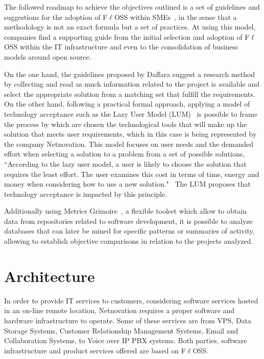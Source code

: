 \documentclass[a4paper, 12pt]{book}
\begin{document}
The followed roadmap to achieve the objectives outlined is a set of guidelines and suggestions for the adoption of F$\ell$OSS within SMEs~\cite{Daffara1}, in the sense that a methodology is not an exact formula but a set of practices. At using this model, companies find a supporting guide from the initial selection and adoption of F$\ell$OSS within the IT infrastructure and even to the consolidation of business models around open source.\bigskip

\noindent On the one hand, the guidelines proposed by Daffara suggest a research method by collecting and read as much information related to the project is available and select the appropriate solution from a matching set that fulfill the requirements. On the other hand, following a practical formal approach, applying a model of technology acceptance such as the Lazy User Model (LUM)~\cite{CandT1} is possible to frame the process by which are chosen the technological tools that will make up the solution that meets user requirements, which in this case is being represented by the company Netnovation. This model focuses on user needs and the demanded effort when selecting a solution to a problem from a set of possible solutions, ``According to the lazy user model, a user is likely to choose the solution that requires the least effort. The user examines this cost in terms of time, energy and money when considering how to use a new solution."~\cite{CandT2} The LUM proposes that technology acceptance is impacted 
by this principle.\bigskip

\noindent Additionally using Metrics Grimoire~\cite{GSyC}, a flexible toolset which allow to obtain data from repositories related to software development, it is possible to analyze databases that can later be mined for specific patterns or summaries of activity, allowing to establish objective comparisons in relation to the projects analyzed.


%
\chapter{Architecture}
\label{chap:architecture}

In order to provide IT services to customers, considering software services hosted in an on-line remote location, Netnovation requires a proper software and hardware infrastructure to operate. Some of these services are from VPS, Data Storage Systems, Customer Relationship Management Systems, Email and Collaboration Systems, to Voice over IP PBX systems. Both parties, software infrastructure and product services offered are based on F$\ell$OSS.\bigskip
\end{document}
